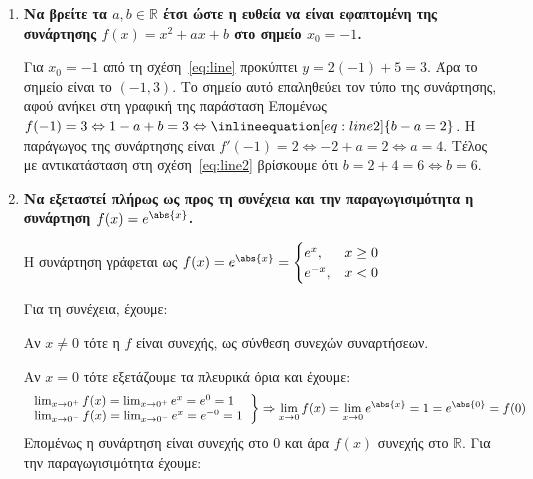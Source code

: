 \documentclass[a4paper,table]{report}
\begin{document}
\begin{center}
  \minibox{\large \bfseries \textcolor{Col1}{Ασκήσεις στις Παραγώγους}}
\end{center}

\vspace{\baselineskip}

\begin{enumerate}
	\item {\bfseries \boldmath Να βρείτε τα $ a, b \in \mathbb{R} $ έτσι ώστε η ευθεία
		 να είναι εφαπτομένη της συνάρτησης 
    $ f(x) = x^{2} + ax + b $ στο σημείο $ x_{0} = -1 $.} 
  \begin{solution}
		Για $ x_{0} = -1 $ από τη σχέση~\eqref{eq:line}  προκύπτει $ y = 2(-1) + 5 =
		3$. Άρα το σημείο είναι το $ (-1,3) $. Το σημείο αυτό επαληθεύει τον
		τύπο της συνάρτησης, αφού ανήκει στη γραφική της παράσταση
		Επομένως $ f(-1) = 3 \Leftrightarrow 1 - a + b = 3
		\Leftrightarrow \inlineequation[eq:line2]{b - a = 2} $. 
		Η παράγωγος της συνάρτησης είναι $ f'(-1) = 2 \Leftrightarrow -2 + a = 2
		\Leftrightarrow a = 4$. Τέλος με αντικατάσταση στη σχέση~\eqref{eq:line2} 
    βρίσκουμε ότι $ b = 2 + 4 = 6 \Leftrightarrow b=6 $.
  \end{solution}


	\item {\bfseries \boldmath Να εξεταστεί πλήρως ως προς τη συνέχεια και την 
      παραγωγισιμότητα η συνάρτηση $ f(x) = e^{\abs{x}} $.}
    \begin{solution}

		Η συνάρτηση γράφεται ως $ f(x) = e^{\abs{x}} = \begin{cases}
				e^{x}, & x\geq 0 \\
				e^{-x}, & x < 0 
			\end{cases}$	
		
		Για τη συνέχεια, έχουμε:

		Αν $ x\neq 0 $ τότε η $f$ είναι συνεχής, ως σύνθεση συνεχών συναρτήσεων.

		Αν $ x = 0 $ τότε εξετάζουμε τα πλευρικά όρια και έχουμε:
		\[
		\left.
		\begin{tabular}{l}
			$\lim_{x\to 0^{+}} f(x) = \lim_{x\to 0^{+}} e^{x} =  e^{0} = 1$ \\ 
			$\lim_{x\to 0^{-}} f(x) = \lim_{x\to 0^{-}} e^{x} = e^{-0} = 1$
		\end{tabular}
		\right\}
		\Rightarrow \lim_{x\to 0} f(x) = \lim_{x\to 0} e^{\abs{x}} = 1 = e^{\abs{0}} = f(0) 
		\]
		Επομένως η συνάρτηση είναι συνεχής στο 0 και άρα $ f(x) $ συνεχής στο $
		\mathbb{R} $.
		Για την παραγωγισιμότητα έχουμε:


\end{solution}
\end{enumerate}
\end{document}
